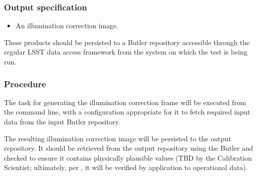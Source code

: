 \subsubsection{Output specification}

\begin{itemize}

  \item{An illumination correction image.}

\end{itemize}

These products should be persisted to a Butler repository accessible through
the regular LSST data access framework from the system on which the test is
being run.

\subsubsection{Procedure}

The task for generating the illumination correction frame will be executed from the
command line, with a configuration appropriate for it to fetch required input
data from the input Butler repository.

The resulting illumination correction image will be persisted to the output
repository. It should be retrieved from the output repository using the Butler
and checked to ensure it contains physically plausible values (TBD by the
Calibration Scientist; ultimately, per , it will be verified by
application to operational data).
